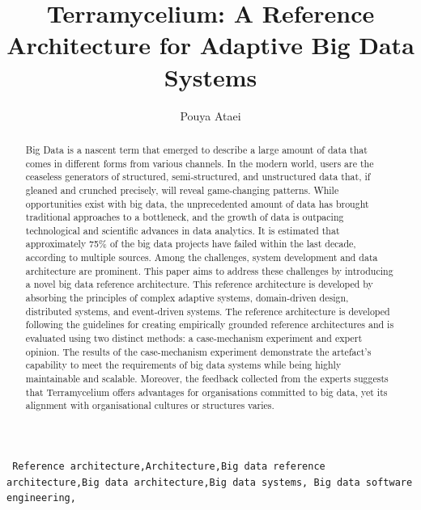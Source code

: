 \documentclass[preprint,12pt]{elsarticle}
\begin{document}
\begin{frontmatter}

\title{Terramycelium: A Reference Architecture for Adaptive Big Data Systems}

\author{Pouya Ataei}

\address[mymainaddress]{School of Engineering, Computer and Mathematical Sciences, Auckland University of Technology, Auckland, New Zealand}


\begin{abstract}
    Big Data is a nascent term that emerged to describe a large amount of data that comes in different forms from various channels. In the modern world, users are the ceaseless generators of structured, semi-structured, and unstructured data that, if gleaned and crunched precisely, will reveal game-changing patterns. While opportunities exist with big data, the unprecedented amount of data has brought traditional approaches to a bottleneck, and the growth of data is outpacing technological and scientific advances in data analytics. It is estimated that approximately 75\% of the big data projects have failed within the last decade, according to multiple sources. Among the challenges, system development and data architecture are prominent. This paper aims to address these challenges by introducing a novel big data reference architecture. This reference architecture is developed by absorbing the principles of complex adaptive systems, domain-driven design, distributed systems, and event-driven systems. The reference architecture is developed following the guidelines for creating empirically grounded reference architectures and is evaluated using two distinct methods: a case-mechanism experiment and expert opinion. The results of the case-mechanism experiment demonstrate the artefact's capability to meet the requirements of big data systems while being highly maintainable and scalable. Moreover, the feedback collected from the experts suggests that Terramycelium offers advantages for organisations committed to big data, yet its alignment with organisational cultures or structures varies.
\end{abstract}

\begin{keyword}
\texttt{ Reference architecture\sep Architecture\sep Big data
reference architecture\sep Big data architecture\sep Big data systems\sep
Big data software engineering\sep}
\end{keyword}

\end{frontmatter}
\end{document}
